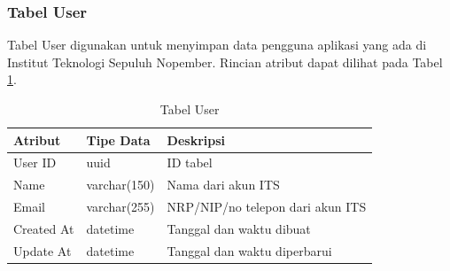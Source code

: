 \subsubsection{Tabel User}
\par Tabel User digunakan untuk menyimpan data pengguna aplikasi yang ada di Institut Teknologi Sepuluh Nopember. Rincian atribut dapat dilihat pada Tabel \ref{tabel_user}.
\begin{longtable}{|p{2cm}|p{2.5cm}|p{4.5cm}|}
 	\caption{Tabel User} \label{tabel_user} \\ \hline
    \rowcolor{lightgray} {Atribut} & {Tipe Data} & {Deskripsi} \\ \hline
    \endhead
    User ID & uuid & ID tabel \\ \hline
    Name & varchar(150) & Nama dari akun ITS \\ \hline
    Email & varchar(255) & NRP/NIP/no telepon dari akun ITS \\ \hline
    Created At & datetime & Tanggal dan waktu dibuat \\ \hline
    Update At & datetime & Tanggal dan waktu diperbarui \\ \hline
\end{longtable}

